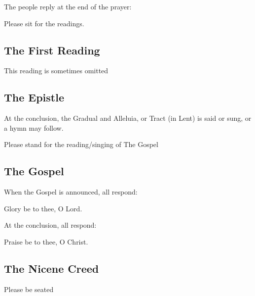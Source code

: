 \begin{rubric}
The people reply at the end of the prayer:\\
\end{rubric}

\begin{rubric}
Please sit for the readings.
\end{rubric}

\subsection{The First Reading}
\begin{rubric}
This reading is sometimes omitted
\end{rubric}

\subsection{The Epistle}
\begin{rubric}
At the conclusion, the Gradual and Alleluia, or Tract (in Lent) is said or sung, or a hymn may follow.
\end{rubric}

\begin{rubric}
Please stand for the reading/singing of The Gospel
\end{rubric}

\subsection{The Gospel}

\begin{rubric}
When the Gospel is announced, all respond:
\end{rubric}
\cross Glory be to thee, O Lord.

\begin{rubric}
At the conclusion, all respond:
\end{rubric}
Praise be to thee, O Christ.

\subsection{The Nicene Creed}



\begin{rubric}
Please be seated
\end{rubric}

